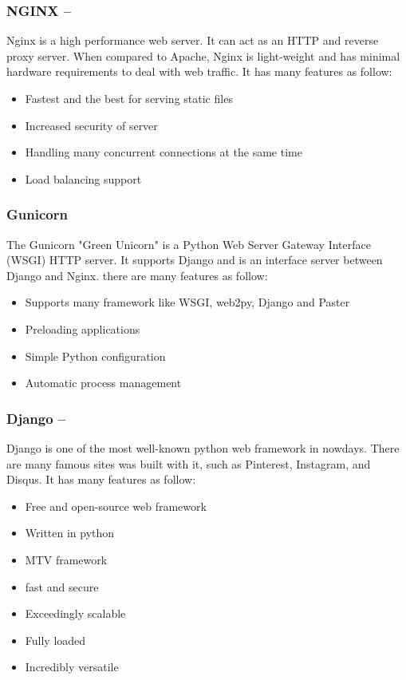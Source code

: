 \subsubsection*{NGINX  --  }

Nginx is a high performance web server. It can act as an HTTP and reverse proxy server. When compared to Apache, Nginx is light-weight and has minimal hardware requirements to deal with web traffic. It has many features as follow:
\begin{itemize}
	\item Fastest and the best for serving static files
	\item Increased security of server
	\item Handling many concurrent connections at the same time
	\item Load balancing support
\end{itemize}

\subsubsection*{Gunicorn}
The Gunicorn "Green Unicorn" is a Python Web Server Gateway Interface (WSGI) HTTP server. It supports Django and is an interface server between Django and Nginx.
there are many features as follow:
\begin{itemize}
	\item Supports many framework like WSGI, web2py, Django and Paster
	\item Preloading applications
	\item Simple Python configuration
	\item Automatic process management
\end{itemize}
\subsubsection*{Django  --  }
Django is one of the most well-known python web framework in nowdays. There are many famous sites was built with it, such as Pinterest, Instagram, and Disqus. It has many features as follow:
\begin{itemize}
	\item Free and open-source web framework
	\item Written in python
	\item MTV framework
	\item fast and secure
	\item Exceedingly scalable
	\item Fully loaded
	\item Incredibly versatile
\end{itemize}


